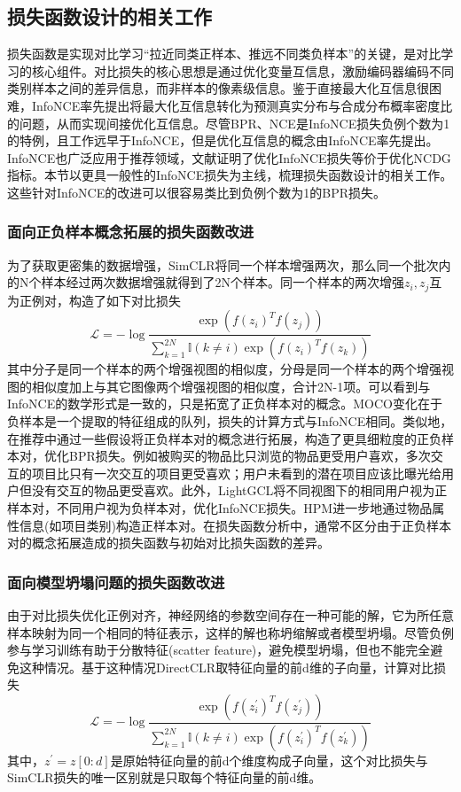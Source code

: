 \subsection{损失函数设计的相关工作}
损失函数是实现对比学习“拉近同类正样本、推远不同类负样本”的关键，是对比学习的核心组件。对比损失的核心思想是通过优化变量互信息，激励编码器编码不同类别样本之间的差异信息，而非样本的像素级信息。鉴于直接最大化互信息很困难，InfoNCE\cite{Oord:2018:arxiv}率先提出将最大化互信息转化为预测真实分布与合成分布概率密度比的问题，从而实现间接优化互信息。尽管BPR\cite{Steffen:2009:UAI}、NCE\cite{Gutmann:2010:ICAIS}是InfoNCE损失负例个数为1的特例，且工作远早于InfoNCE，但是优化互信息的概念由InfoNCE率先提出。InfoNCE也广泛应用于推荐领域，文献\cite{Jiancan:2022:arxiv}证明了优化InfoNCE损失等价于优化NCDG指标。本节以更具一般性的InfoNCE损失为主线，梳理损失函数设计的相关工作。这些针对InfoNCE的改进可以很容易类比到负例个数为1的BPR损失。
\subsubsection{面向正负样本概念拓展的损失函数改进}
为了获取更密集的数据增强，SimCLR\cite{Chen:2020:ICML}将同一个样本增强两次，那么同一个批次内的N个样本经过两次数据增强就得到了2N个样本。同一个样本的两次增强$z_i,z_j$互为正例对，构造了如下对比损失
\[
\mathcal{L} = -\log \frac{\exp(f(z_i)^Tf(z_j))}{\sum_{k=1}^{2N}\mathbb I (k \neq i)\exp(f(z_i)^Tf(z_k))}
\]
其中分子是同一个样本的两个增强视图的相似度，分母是同一个样本的两个增强视图的相似度加上与其它图像两个增强视图的相似度，合计2N-1项。可以看到与InfoNCE的数学形式是一致的，只是拓宽了正负样本对的概念。MOCO\cite{He:2020:CVPR}变化在于负样本是一个提取的特征组成的队列，损失的计算方式与InfoNCE相同。类似地，在推荐中通过一些假设将正负样本对的概念进行拓展，构造了更具细粒度的正负样本对，优化BPR损失。例如被购买的物品比只浏览的物品更受用户喜欢\cite{Qiu:2018:IS}，多次交互的项目比只有一次交互的项目更受喜欢\cite{Lerche:2014:RS}；用户未看到的潜在项目应该比曝光给用户但没有交互的物品更受喜欢\cite{Wenhui:2019:WWW,Yu:2018:CIKM,Bin:2020:IS}。此外，LightGCL\cite{lightgcl:2023:ICLR}将不同视图下的相同用户视为正样本对，不同用户视为负样本对，优化InfoNCE损失。HPM\cite{huang2023dual}进一步地通过物品属性信息(如项目类别)构造正样本对。在损失函数分析中，通常不区分由于正负样本对的概念拓展造成的损失函数与初始对比损失函数的差异。

\subsubsection{面向模型坍塌问题的损失函数改进}
由于对比损失优化正例对齐，神经网络的参数空间存在一种可能的解，它为所任意样本映射为同一个相同的特征表示，这样的解也称坍缩解或者模型坍塌。尽管负例参与学习训练有助于分散特征(scatter feature)，避免模型坍塌，但也不能完全避免这种情况。基于这种情况DirectCLR\cite{jing2021understanding}取特征向量的前d维的子向量，计算对比损失
\[
\mathcal{L} = -\log \frac{\exp(f(z_i^\prime)^Tf(z_j^\prime))}{\sum_{k=1}^{2N}\mathbb I (k \neq i)\exp(f(z_i^\prime)^Tf(z_k^\prime))}
\]
其中，$z^\prime = z[0:d]$是原始特征向量的前d个维度构成子向量，这个对比损失与SimCLR损失的唯一区别就是只取每个特征向量的前d维。

